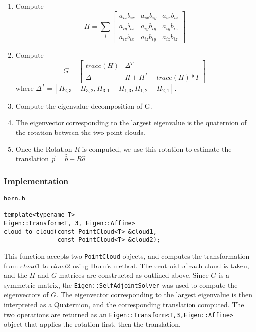 \documentclass[letterpaper, 11pt]{report}
\begin{document}
\begin{enumerate}
\item Compute
$$H = \sum_i{\begin{bmatrix}
				a_{ix}b_{ix} & a_{ix}b_{iy} & a_{ix}b_{iz} \\
                a_{iy}b_{ix} & a_{iy}b_{iy} & a_{iy}b_{iz} \\
                a_{iz}b_{ix} & a_{iz}b_{iy} & a_{iz}b_{iz}
             \end{bmatrix}}$$
             
\item Compute
$$G = \begin{bmatrix}
		trace(H) & \Delta^T \\
        \Delta & H + H^T - trace(H)*I
       \end{bmatrix} $$
       where $\Delta^T = [H_{2,3} - H_{3,2}, H_{3,1} - H_{1,3}, H_{1,2} - H_{2,1}]$.
 \item Compute the eigenvalue decomposition of G.
 \item The eigenvector corresponding to the largest eigenvalue is the quaternion of the rotation between the two point clouds.
 \item Once the Rotation $R$ is computed, we use this rotation to estimate the translation $\vec p = \hat{b} - R\hat{a}$
\end{enumerate}

\subsubsection{Implementation}
\begin{verbatim}
horn.h

template<typename T>
Eigen::Transform<T, 3, Eigen::Affine>
cloud_to_cloud(const PointCloud<T> &cloud1,
               const PointCloud<T> &cloud2);
\end{verbatim}
This function accepts two \texttt{PointCloud} objects, and computes the transformation from $cloud1$ to $cloud2$ using Horn's method. The centroid of each cloud is taken, and the $H$ and $G$ matrices are constructed as outlined above. Since $G$ is a symmetric matrix, the \texttt{Eigen::SelfAdjointSolver} was used to compute the eigenvectors of $G$. The eigenvector corresponding to the largest eigenvalue is then interpreted as a Quaternion, and the corresponding translation computed. The two operations are returned as an \texttt{Eigen::Transform<T,3,Eigen::Affine>} object that applies the rotation first, then the translation.
\end{document}
